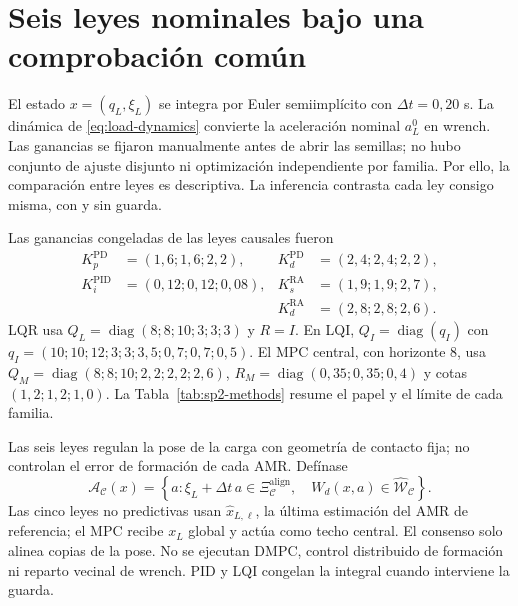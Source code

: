 \section*{Seis leyes nominales bajo una comprobación común}

El estado $x=(q_L,\xi_L)$ se integra por Euler semiimplícito con
$\Delta t=0{,}20$ s. La dinámica de \eqref{eq:load-dynamics} convierte la
aceleración nominal $a_L^0$ en wrench. Las ganancias se fijaron manualmente
antes de abrir las semillas; no hubo conjunto de ajuste disjunto ni optimización
independiente por familia. Por ello, la comparación entre leyes es descriptiva.
La inferencia contrasta cada ley consigo misma, con y sin guarda.

Las ganancias congeladas de las leyes causales fueron
\[
\begin{aligned}
K_p^{\mathrm{PD}}&=(1{,}6;1{,}6;2{,}2), &
K_d^{\mathrm{PD}}&=(2{,}4;2{,}4;2{,}2),\\
K_i^{\mathrm{PID}}&=(0{,}12;0{,}12;0{,}08), &
K_s^{\mathrm{RA}}&=(1{,}9;1{,}9;2{,}7),\\
&&K_d^{\mathrm{RA}}&=(2{,}8;2{,}8;2{,}6).
\end{aligned}
\]
LQR usa $Q_L=\operatorname{diag}(8;8;10;3;3;3)$ y $R=I$. En LQI,
$Q_I=\operatorname{diag}(q_I)$ con
$q_I=(10;10;12;3;3;3{,}5;0{,}7;0{,}7;0{,}5)$. El MPC central, con horizonte 8,
usa $Q_M=\operatorname{diag}(8;8;10;2{,}2;2{,}2;2{,}6)$,
$R_M=\operatorname{diag}(0{,}35;0{,}35;0{,}4)$ y cotas
$(1{,}2;1{,}2;1{,}0)$. La Tabla~\ref{tab:sp2-methods} resume el papel y el
límite de cada familia.

Las seis leyes regulan la pose de la carga con geometría de contacto fija; no
controlan el error de formación de cada AMR. Defínase
\begin{equation}
\mathcal A_{\mathcal C}(x)=\left\{a:
\xi_L+\Delta t\,a\in\Xi_{\mathcal C}^{\mathrm{align}},\quad
W_d(x,a)\in\widehat{\mathcal W}_{\mathcal C}\right\}.
\label{eq:n4-admissible-acceleration}
\end{equation}
Las cinco leyes no predictivas usan $\widehat x_{L,\ell}$, la última estimación
del AMR de referencia; el MPC recibe $x_L$ global y actúa como techo central. El
consenso solo alinea copias de la pose. No se ejecutan DMPC, control distribuido
de formación ni reparto vecinal de wrench. PID y LQI congelan la integral cuando
interviene la guarda.

